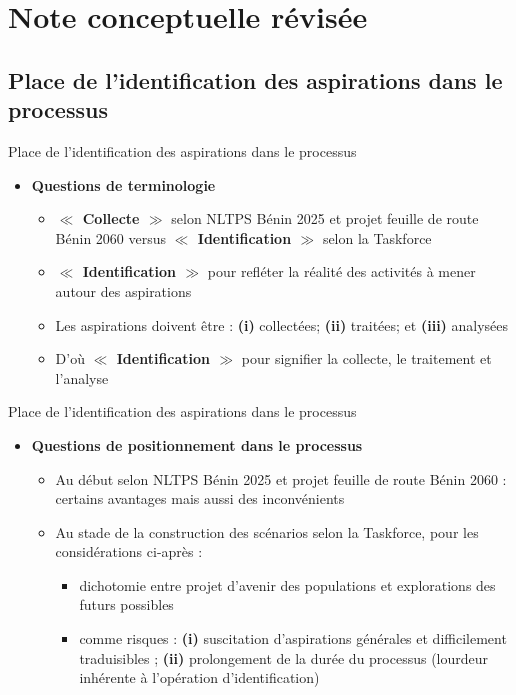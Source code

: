 \documentclass[11pt]{beamer}
\begin{document}
\section{Note conceptuelle révisée}

\subsection{\tiny Place de l’identification des aspirations dans le processus}
\begin{frame}{Place de l’identification des aspirations dans le processus}
\begin{itemize} [<+->]
\item \textbf {Questions de terminologie}  \vfill 
\begin{itemize} [<+->]
   \item  \textbf{$\ll$ Collecte $\gg$} selon NLTPS Bénin 2025 et projet feuille de route Bénin 2060 versus \textbf{$\ll$ Identification $\gg$}  selon la Taskforce \vfill
   \item  \textbf{$\ll$ Identification $\gg$} pour refléter la réalité des activités à mener autour des aspirations \vfill
   \item  Les aspirations doivent être : \textbf{(i)} collectées; \textbf{(ii)} traitées; et \textbf{(iii)} analysées  \vfill
   \item  D’où \textbf{$\ll$ \alert{Identification} $\gg$} pour signifier la collecte, le traitement et l’analyse \vfill
\end{itemize}
\end{itemize}
\end{frame}

\begin{frame}{Place de l’identification des aspirations dans le processus}
\begin{itemize} [<+->]
\item \textbf {Questions de positionnement dans le processus}  \vfill 
\begin{itemize} [<+->]
   \item  Au début selon NLTPS Bénin 2025 et projet feuille de route Bénin 2060 : certains avantages mais aussi des inconvénients \vfill
   \item  Au stade de la construction des scénarios selon la Taskforce, pour les considérations ci-après : \vfill
   \begin{itemize} [<+->]
   \item  dichotomie entre projet d’avenir des populations et explorations des futurs possibles  \vfill
   \item  comme risques : \textbf {(i)}  suscitation d’aspirations générales et difficilement traduisibles ; \textbf {(ii)} prolongement de la durée du processus (lourdeur inhérente à l’opération d’identification) \vfill
   \end{itemize}
\end{itemize}
\end{itemize}
\end{frame}
\end{document}
